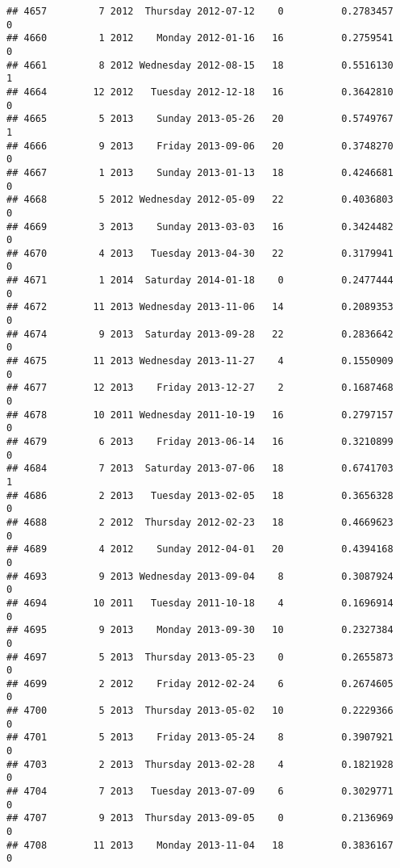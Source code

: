 \documentclass[
]{article}
\begin{document}
\begin{verbatim}
## 4657         7 2012  Thursday 2012-07-12    0          0.2783457             0
## 4660         1 2012    Monday 2012-01-16   16          0.2759541             0
## 4661         8 2012 Wednesday 2012-08-15   18          0.5516130             1
## 4664        12 2012   Tuesday 2012-12-18   16          0.3642810             0
## 4665         5 2013    Sunday 2013-05-26   20          0.5749767             1
## 4666         9 2013    Friday 2013-09-06   20          0.3748270             0
## 4667         1 2013    Sunday 2013-01-13   18          0.4246681             0
## 4668         5 2012 Wednesday 2012-05-09   22          0.4036803             0
## 4669         3 2013    Sunday 2013-03-03   16          0.3424482             0
## 4670         4 2013   Tuesday 2013-04-30   22          0.3179941             0
## 4671         1 2014  Saturday 2014-01-18    0          0.2477444             0
## 4672        11 2013 Wednesday 2013-11-06   14          0.2089353             0
## 4674         9 2013  Saturday 2013-09-28   22          0.2836642             0
## 4675        11 2013 Wednesday 2013-11-27    4          0.1550909             0
## 4677        12 2013    Friday 2013-12-27    2          0.1687468             0
## 4678        10 2011 Wednesday 2011-10-19   16          0.2797157             0
## 4679         6 2013    Friday 2013-06-14   16          0.3210899             0
## 4684         7 2013  Saturday 2013-07-06   18          0.6741703             1
## 4686         2 2013   Tuesday 2013-02-05   18          0.3656328             0
## 4688         2 2012  Thursday 2012-02-23   18          0.4669623             0
## 4689         4 2012    Sunday 2012-04-01   20          0.4394168             0
## 4693         9 2013 Wednesday 2013-09-04    8          0.3087924             0
## 4694        10 2011   Tuesday 2011-10-18    4          0.1696914             0
## 4695         9 2013    Monday 2013-09-30   10          0.2327384             0
## 4697         5 2013  Thursday 2013-05-23    0          0.2655873             0
## 4699         2 2012    Friday 2012-02-24    6          0.2674605             0
## 4700         5 2013  Thursday 2013-05-02   10          0.2229366             0
## 4701         5 2013    Friday 2013-05-24    8          0.3907921             0
## 4703         2 2013  Thursday 2013-02-28    4          0.1821928             0
## 4704         7 2013   Tuesday 2013-07-09    6          0.3029771             0
## 4707         9 2013  Thursday 2013-09-05    0          0.2136969             0
## 4708        11 2013    Monday 2013-11-04   18          0.3836167             0

\end{verbatim}
\end{document}
